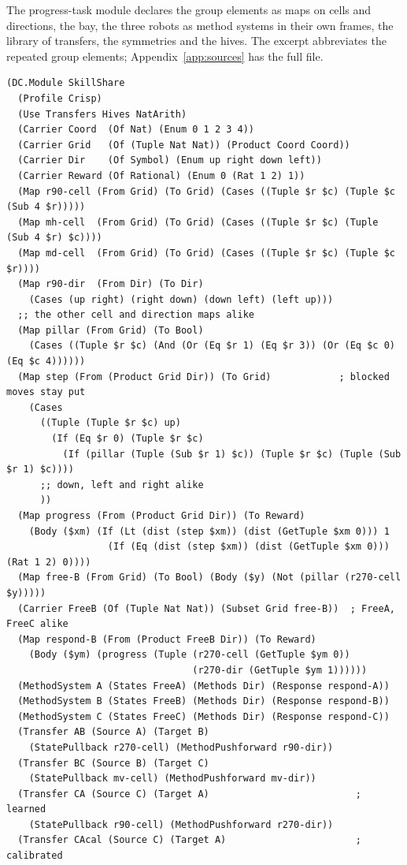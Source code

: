 \documentclass[11pt]{article}
\theoremstyle{definition}
\theoremstyle{plain}
\begin{document}
The progress-task module declares the group elements as maps on cells and directions, the bay, the
three robots as method systems in their own frames, the library of transfers, the symmetries and
the hives. The excerpt abbreviates the repeated group elements; Appendix~\ref{app:sources} has the
full file.
\begin{lstlisting}
(DC.Module SkillShare
  (Profile Crisp)
  (Use Transfers Hives NatArith)
  (Carrier Coord  (Of Nat) (Enum 0 1 2 3 4))
  (Carrier Grid   (Of (Tuple Nat Nat)) (Product Coord Coord))
  (Carrier Dir    (Of Symbol) (Enum up right down left))
  (Carrier Reward (Of Rational) (Enum 0 (Rat 1 2) 1))
  (Map r90-cell (From Grid) (To Grid) (Cases ((Tuple $r $c) (Tuple $c (Sub 4 $r)))))
  (Map mh-cell  (From Grid) (To Grid) (Cases ((Tuple $r $c) (Tuple (Sub 4 $r) $c))))
  (Map md-cell  (From Grid) (To Grid) (Cases ((Tuple $r $c) (Tuple $c $r))))
  (Map r90-dir  (From Dir) (To Dir)
    (Cases (up right) (right down) (down left) (left up)))
  ;; the other cell and direction maps alike
  (Map pillar (From Grid) (To Bool)
    (Cases ((Tuple $r $c) (And (Or (Eq $r 1) (Eq $r 3)) (Or (Eq $c 0) (Eq $c 4))))))
  (Map step (From (Product Grid Dir)) (To Grid)            ; blocked moves stay put
    (Cases
      ((Tuple (Tuple $r $c) up)
        (If (Eq $r 0) (Tuple $r $c)
          (If (pillar (Tuple (Sub $r 1) $c)) (Tuple $r $c) (Tuple (Sub $r 1) $c))))
      ;; down, left and right alike
      ))
  (Map progress (From (Product Grid Dir)) (To Reward)
    (Body ($xm) (If (Lt (dist (step $xm)) (dist (GetTuple $xm 0))) 1
                  (If (Eq (dist (step $xm)) (dist (GetTuple $xm 0))) (Rat 1 2) 0))))
  (Map free-B (From Grid) (To Bool) (Body ($y) (Not (pillar (r270-cell $y)))))
  (Carrier FreeB (Of (Tuple Nat Nat)) (Subset Grid free-B))  ; FreeA, FreeC alike
  (Map respond-B (From (Product FreeB Dir)) (To Reward)
    (Body ($ym) (progress (Tuple (r270-cell (GetTuple $ym 0))
                                 (r270-dir (GetTuple $ym 1))))))
  (MethodSystem A (States FreeA) (Methods Dir) (Response respond-A))
  (MethodSystem B (States FreeB) (Methods Dir) (Response respond-B))
  (MethodSystem C (States FreeC) (Methods Dir) (Response respond-C))
  (Transfer AB (Source A) (Target B)
    (StatePullback r270-cell) (MethodPushforward r90-dir))
  (Transfer BC (Source B) (Target C)
    (StatePullback mv-cell) (MethodPushforward mv-dir))
  (Transfer CA (Source C) (Target A)                          ; learned
    (StatePullback r90-cell) (MethodPushforward r270-dir))
  (Transfer CAcal (Source C) (Target A)                       ; calibrated

\end{lstlisting}
\end{document}
